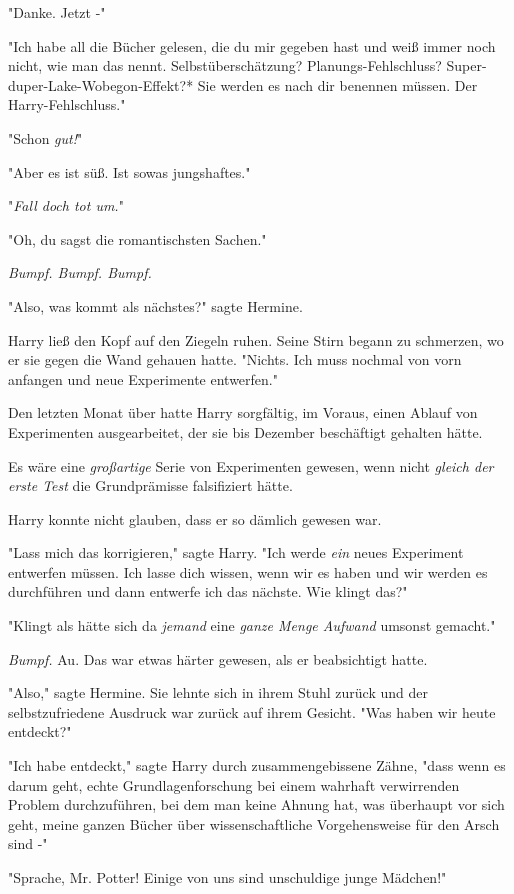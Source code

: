 {"Danke. Jetzt -"

"Ich habe all die Bücher gelesen, die du mir gegeben hast und weiß immer noch nicht, wie man das nennt. Selbstüberschätzung? Planungs-Fehlschluss? Super-duper-Lake-Wobegon-Effekt?* Sie werden es nach dir benennen müssen. Der Harry-Fehlschluss."

"Schon \emph{gut!}"

"Aber es ist süß. Ist sowas jungshaftes."

"\emph{Fall doch tot um.}"

"Oh, du sagst die romantischsten Sachen."

\emph{Bumpf. Bumpf. Bumpf.}

"Also, was kommt als nächstes?" sagte Hermine.

Harry ließ den Kopf auf den Ziegeln ruhen. Seine Stirn begann zu schmerzen, wo er sie gegen die Wand gehauen hatte. "Nichts. Ich muss nochmal von vorn anfangen und neue Experimente entwerfen."

Den letzten Monat über hatte Harry sorgfältig, im Voraus, einen Ablauf von Experimenten ausgearbeitet, der sie bis Dezember beschäftigt gehalten hätte.

Es wäre eine \emph{großartige} Serie von Experimenten gewesen, wenn nicht \emph{gleich der erste Test} die Grundprämisse falsifiziert hätte.

Harry konnte nicht glauben, dass er so dämlich gewesen war.

"Lass mich das korrigieren," sagte Harry. "Ich werde \emph{ein} neues Experiment entwerfen müssen. Ich lasse dich wissen, wenn wir es haben und wir werden es durchführen und dann entwerfe ich das nächste. Wie klingt das?"

"Klingt als hätte sich da \emph{jemand} eine \emph{ganze Menge Aufwand} umsonst gemacht."

\emph{Bumpf.} Au. Das war etwas härter gewesen, als er beabsichtigt hatte.

"Also," sagte Hermine. Sie lehnte sich in ihrem Stuhl zurück und der selbstzufriedene Ausdruck war zurück auf ihrem Gesicht. "Was haben wir heute entdeckt?"

"Ich habe entdeckt," sagte Harry durch zusammengebissene Zähne, "dass wenn es darum geht, echte Grundlagenforschung bei einem wahrhaft verwirrenden Problem durchzuführen, bei dem man keine Ahnung hat, was überhaupt vor sich geht, meine ganzen Bücher über wissenschaftliche Vorgehensweise für den Arsch sind -"

"Sprache, Mr. Potter! Einige von uns sind unschuldige junge Mädchen!"

}
